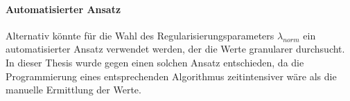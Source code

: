 \paragraph{Automatisierter Ansatz}
Alternativ könnte für die Wahl des Regularisierungsparameters $\lambda_{norm}$ ein automatisierter Ansatz verwendet werden, der die Werte granularer durchsucht. In dieser Thesis wurde gegen einen solchen Ansatz entschieden, da die Programmierung eines entsprechenden Algorithmus zeitintensiver wäre als die manuelle Ermittlung der Werte.
